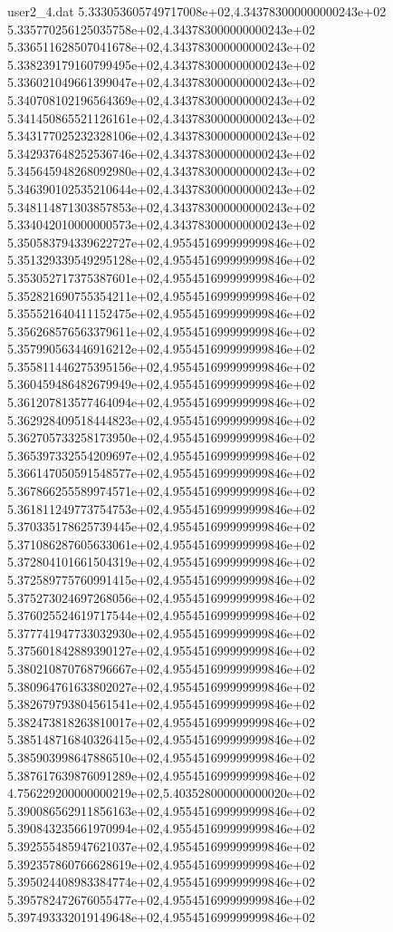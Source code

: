 \begin{filecontents}{user2_4.dat}
5.333053605749717008e+02,4.343783000000000243e+02
5.335770256125035758e+02,4.343783000000000243e+02
5.336511628507041678e+02,4.343783000000000243e+02
5.338239179160799495e+02,4.343783000000000243e+02
5.336021049661399047e+02,4.343783000000000243e+02
5.340708102196564369e+02,4.343783000000000243e+02
5.341450865521126161e+02,4.343783000000000243e+02
5.343177025232328106e+02,4.343783000000000243e+02
5.342937648252536746e+02,4.343783000000000243e+02
5.345645948268092980e+02,4.343783000000000243e+02
5.346390102535210644e+02,4.343783000000000243e+02
5.348114871303857853e+02,4.343783000000000243e+02
5.334042010000000573e+02,4.343783000000000243e+02
5.350583794339622727e+02,4.955451699999999846e+02
5.351329339549295128e+02,4.955451699999999846e+02
5.353052717375387601e+02,4.955451699999999846e+02
5.352821690755354211e+02,4.955451699999999846e+02
5.355521640411152475e+02,4.955451699999999846e+02
5.356268576563379611e+02,4.955451699999999846e+02
5.357990563446916212e+02,4.955451699999999846e+02
5.355811446275395156e+02,4.955451699999999846e+02
5.360459486482679949e+02,4.955451699999999846e+02
5.361207813577464094e+02,4.955451699999999846e+02
5.362928409518444823e+02,4.955451699999999846e+02
5.362705733258173950e+02,4.955451699999999846e+02
5.365397332554209697e+02,4.955451699999999846e+02
5.366147050591548577e+02,4.955451699999999846e+02
5.367866255589974571e+02,4.955451699999999846e+02
5.361811249773754753e+02,4.955451699999999846e+02
5.370335178625739445e+02,4.955451699999999846e+02
5.371086287605633061e+02,4.955451699999999846e+02
5.372804101661504319e+02,4.955451699999999846e+02
5.372589775760991415e+02,4.955451699999999846e+02
5.375273024697268056e+02,4.955451699999999846e+02
5.376025524619717544e+02,4.955451699999999846e+02
5.377741947733032930e+02,4.955451699999999846e+02
5.375601842889390127e+02,4.955451699999999846e+02
5.380210870768796667e+02,4.955451699999999846e+02
5.380964761633802027e+02,4.955451699999999846e+02
5.382679793804561541e+02,4.955451699999999846e+02
5.382473818263810017e+02,4.955451699999999846e+02
5.385148716840326415e+02,4.955451699999999846e+02
5.385903998647886510e+02,4.955451699999999846e+02
5.387617639876091289e+02,4.955451699999999846e+02
4.756229200000000219e+02,5.403528000000000020e+02
5.390086562911856163e+02,4.955451699999999846e+02
5.390843235661970994e+02,4.955451699999999846e+02
5.392555485947621037e+02,4.955451699999999846e+02
5.392357860766628619e+02,4.955451699999999846e+02
5.395024408983384774e+02,4.955451699999999846e+02
5.395782472676055477e+02,4.955451699999999846e+02
5.397493332019149648e+02,4.955451699999999846e+02

\end{filecontents}
